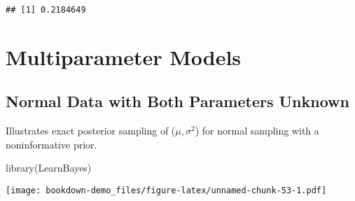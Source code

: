 \documentclass[
]{book}
\newenvironment{Shaded}{\begin{snugshade}}{\end{snugshade}}
\newcommand{\AttributeTok}[1]{\textcolor[rgb]{0.77,0.63,0.00}{#1}}
\newcommand{\DecValTok}[1]{\textcolor[rgb]{0.00,0.00,0.81}{#1}}
\newcommand{\FunctionTok}[1]{\textcolor[rgb]{0.00,0.00,0.00}{#1}}
\newcommand{\NormalTok}[1]{#1}
\newcommand{\SpecialCharTok}[1]{\textcolor[rgb]{0.00,0.00,0.00}{#1}}
\newcommand{\StringTok}[1]{\textcolor[rgb]{0.31,0.60,0.02}{#1}}
\begin{document}
\begin{verbatim}
## [1] 0.2184649
\end{verbatim}

\hypertarget{multiparameter-models}{%
\chapter{Multiparameter Models}\label{multiparameter-models}}

\hypertarget{normal-data-with-both-parameters-unknown}{%
\section{Normal Data with Both Parameters Unknown}\label{normal-data-with-both-parameters-unknown}}

Illustrates exact posterior sampling of (\(\mu, \sigma^2\)) for normal sampling with a noninformative prior.

\begin{Shaded}
\begin{Highlighting}[]
\FunctionTok{library}\NormalTok{(LearnBayes)}
\end{Highlighting}
\end{Shaded}

\begin{Shaded}
\end{Shaded}

\texttt{[image: bookdown-demo\_files/figure-latex/unnamed-chunk-53-1.pdf]}
\end{document}
